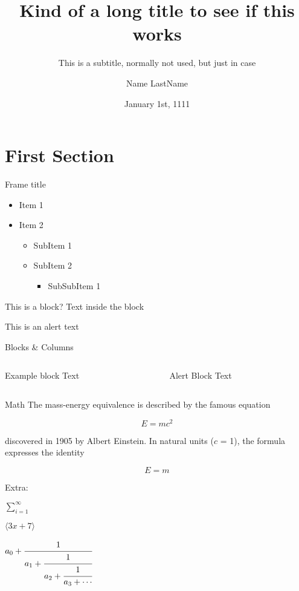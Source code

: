 \documentclass{beamer}
\begin{document}
\title[short version of the title]{Kind of a long title to see if this works}
\subtitle{This is a subtitle, normally not used, but just in case}

\author{Name LastName} 
\date{January 1st, 1111} 

\frame{\titlepage} 



\section{First Section} 

\begin{frame}{Frame title}
\begin{itemize}
 \item Item 1
 \item Item 2
 \begin{itemize}
  \item SubItem 1
  \item SubItem 2
  \begin{itemize}
  	\item SubSubItem 1
  \end{itemize}
\end{itemize}
\end{itemize}
\begin{block}{This is a block?}
Text inside the block
\end{block}
\alert{This is an alert text}
\end{frame}

\begin{frame}{Blocks \& Columns}
  \begin{columns}[T]
    \begin{column}{.5\textwidth}
      \begin{exampleblock}{Example block}
        Text
      \end{exampleblock}
    \end{column}
    \begin{column}{.5\textwidth}
      \begin{alertblock}{Alert Block}
        Text
      \end{alertblock}
    \end{column}
  \end{columns}
\end{frame}

\begin{frame}{Math}
The mass-energy equivalence is described by the famous equation
 
$$E=mc^2$$
 
discovered in 1905 by Albert Einstein. 
In natural units ($c$ = 1), the formula expresses the identity
 
\begin{equation}
E=m
\end{equation}

Extra:

$ \sum_{i=1}^{\infty} $


$ \Bigg \langle 3x+7 \Bigg \rangle $




 $ a_0+\cfrac{1}{a_1+\cfrac{1}{a_2+\cfrac{1}{a_3+\cdots}}} $
\end{frame}
\end{document}
